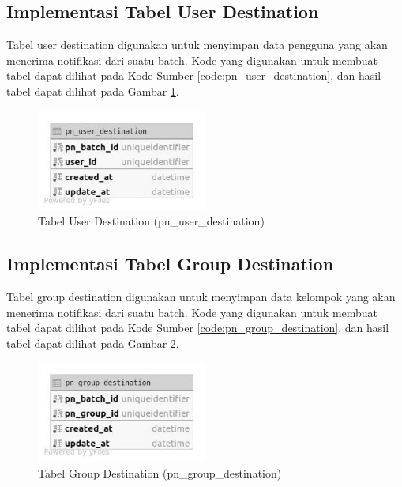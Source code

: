 \subsection{Implementasi Tabel User Destination}
\par Tabel user destination digunakan untuk menyimpan data pengguna yang akan menerima notifikasi dari suatu batch. Kode yang digunakan untuk membuat tabel dapat dilihat pada Kode Sumber \ref{code:pn_user_destination}, dan hasil tabel dapat dilihat pada Gambar \ref{tabel_pn_user_destination}.

\begin{figure}[H]
    \centering\includegraphics[width=0.5\textwidth]{bab4/figures/tabel_pn_user_destination.jpg}
    \caption{Tabel User Destination (pn\_user\_destination)}
    \label{tabel_pn_user_destination}
\end{figure}

\subsection{Implementasi Tabel Group Destination}
\par Tabel group destination digunakan untuk menyimpan data kelompok yang akan menerima notifikasi dari suatu batch. Kode yang digunakan untuk membuat tabel dapat dilihat pada Kode Sumber \ref{code:pn_group_destination}, dan hasil tabel dapat dilihat pada Gambar \ref{tabel_pn_group_destination}.

\begin{figure}[H]
    \centering\includegraphics[width=0.5\textwidth]{bab4/figures/tabel_pn_group_destination.jpg}
    \caption{Tabel Group Destination (pn\_group\_destination)}
    \label{tabel_pn_group_destination}
\end{figure}

